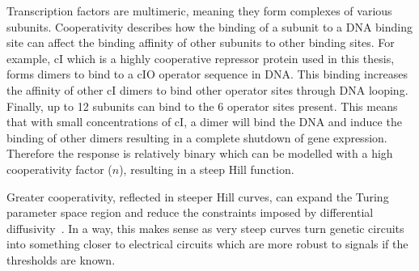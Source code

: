 Transcription factors are multimeric, meaning they form complexes of various subunits.
Cooperativity describes how the binding of a subunit to a DNA binding site can affect the binding affinity of other subunits to other binding sites.
For example, cI which is a highly cooperative repressor protein used in this thesis, forms dimers to bind to a cIO operator sequence in DNA.
This binding increases the affinity of other cI dimers to bind other operator sites through DNA looping.
Finally, up to 12 subunits can bind to the 6 operator sites present.
This means that with small concentrations of cI, a dimer will bind the DNA and induce the binding of other dimers resulting in a complete shutdown of gene expression.
Therefore the response is relatively binary which can be modelled with a high cooperativity factor ($n$), resulting in a steep Hill function.


Greater cooperativity, reflected in steeper Hill curves, can expand the Turing parameter space region and reduce the constraints imposed by differential diffusivity~\parencite{Diambra2015a}.
In a way, this makes sense as very steep curves turn genetic circuits into something closer to electrical circuits which are more robust to signals if the thresholds are known.
%
%



